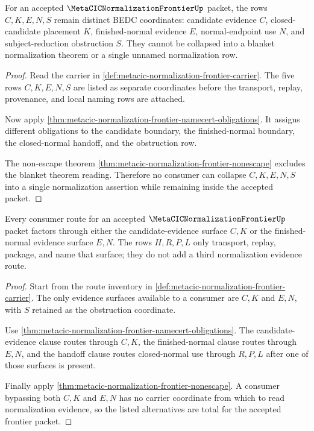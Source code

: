\begin{theorem}
\label{thm:metacic-normalization-frontier-boundary-disjointness}
For an accepted $\MetaCICNormalizationFrontierUp$ packet, the rows $C,K,E,N,S$ remain distinct BEDC coordinates: candidate evidence $C$, closed-candidate placement $K$, finished-normal evidence $E$, normal-endpoint use $N$, and subject-reduction obstruction $S$. They cannot be collapsed into a blanket normalization theorem or a single unnamed normalization row.
\end{theorem}
\begin{proof}
Read the carrier in \autoref{def:metacic-normalization-frontier-carrier}. The five rows $C,K,E,N,S$ are listed as separate coordinates before the transport, replay, provenance, and local naming rows are attached.

Now apply \autoref{thm:metacic-normalization-frontier-namecert-obligations}. It assigns different obligations to the candidate boundary, the finished-normal boundary, the closed-normal handoff, and the obstruction row.

The non-escape theorem \autoref{thm:metacic-normalization-frontier-nonescape} excludes the blanket theorem reading. Therefore no consumer can collapse $C,K,E,N,S$ into a single normalization assertion while remaining inside the accepted packet.
\end{proof}

\begin{theorem}
\label{thm:metacic-normalization-frontier-consumer-route-totality}
Every consumer route for an accepted $\MetaCICNormalizationFrontierUp$ packet factors through either the candidate-evidence surface $C,K$ or the finished-normal evidence surface $E,N$. The rows $H,R,P,L$ only transport, replay, package, and name that surface; they do not add a third normalization evidence route.
\end{theorem}
\begin{proof}
Start from the route inventory in \autoref{def:metacic-normalization-frontier-carrier}. The only evidence surfaces available to a consumer are $C,K$ and $E,N$, with $S$ retained as the obstruction coordinate.

Use \autoref{thm:metacic-normalization-frontier-namecert-obligations}. The candidate-evidence clause routes through $C,K$, the finished-normal clause routes through $E,N$, and the handoff clause routes closed-normal use through $R,P,L$ after one of those surfaces is present.

Finally apply \autoref{thm:metacic-normalization-frontier-nonescape}. A consumer bypassing both $C,K$ and $E,N$ has no carrier coordinate from which to read normalization evidence, so the listed alternatives are total for the accepted frontier packet.
\end{proof}


